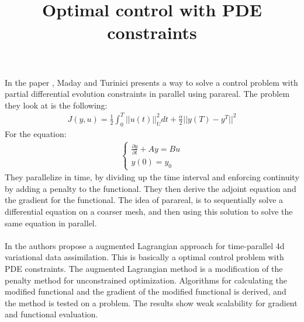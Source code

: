 \documentclass[11pt,a4paper]{article}
\title{Optimal control with PDE constraints}
\begin{document}
\maketitle
\tableofcontents
{}


In the paper \cite{maday2002parareal}, Maday and Turinici presents a way to solve a control problem with partial differential evolution constraints in parallel using parareal. The problem they look at is the following:
\begin{align*}
J(y,u) = \frac{1}{2}\int_0^T||u(t)||_U^2dt + \frac{\alpha}{2}||y(T)-y^T||^2
\end{align*} 
For the equation:
\begin{align*}
\left\{
     \begin{array}{lr}
       	\frac{\partial y}{\partial t}+Ay = Bu\\
       	   y(0)=y_0
     \end{array}
   \right.
\end{align*}
They parallelize in time, by dividing up the time interval and enforcing continuity by adding a penalty to the functional. They then derive the adjoint equation and the gradient for the functional. The idea of parareal, is to sequentially solve a differential equation on a coarser mesh, and then using this solution to solve the same equation in parallel. 
\\
\\
In \cite{rao2016time} the authors propose a augmented Lagrangian approach for time-parallel 4d variational data assimilation. This is basically a optimal control problem with PDE constraints. The augmented Lagrangian method is a modification of the penalty method for unconstrained optimization. Algorithms for calculating the modified functional and the gradient of the modified functional is derived, and the method is tested on a problem. The results show weak scalability for gradient and functional evaluation.  
\end{document}
